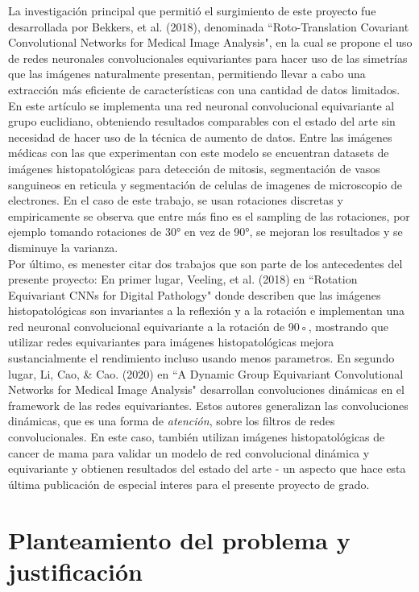 \documentclass[12pt,letterpaper,final, openany]{scrbook}
\begin{document}
La investigación principal que permitió el surgimiento de este proyecto fue desarrollada por Bekkers, et al. (2018), denominada ``Roto-Translation Covariant Convolutional Networks for Medical Image Analysis", en la cual se propone el uso de redes neuronales convolucionales equivariantes para hacer uso de las simetrías que las imágenes naturalmente presentan, permitiendo llevar a cabo una extracción más eficiente de características con una cantidad de datos limitados. En este artículo se implementa una red neuronal convolucional equivariante al grupo euclidiano, obteniendo resultados comparables con el estado del arte sin necesidad de hacer uso de la técnica de aumento de datos. Entre las imágenes médicas con las que experimentan con este modelo se encuentran datasets de imágenes histopatológicas para detección de mitosis, segmentación de vasos sanguineos en reticula y segmentación de celulas de imagenes de microscopio de electrones. En el caso de este trabajo, se usan rotaciones discretas y empiricamente se observa que entre más fino es el sampling de las rotaciones, por ejemplo tomando rotaciones de 30° en vez de 90°, se mejoran los resultados y se disminuye la varianza.
\\
Por último, es menester citar dos trabajos que son parte de los antecedentes del presente proyecto: En primer lugar, Veeling, et al. (2018) en ``Rotation Equivariant CNNs for Digital Pathology" donde describen que las imágenes histopatológicas son invariantes a la reflexión y a la rotación e implementan una red neuronal convolucional equivariante a la rotación de 90◦, mostrando que utilizar redes equivariantes para imágenes histopatológicas mejora sustancialmente el rendimiento incluso usando menos parametros. En segundo lugar, Li, Cao, \& Cao. (2020) en ``A Dynamic Group Equivariant Convolutional Networks for Medical Image Analysis" desarrollan convoluciones dinámicas en el framework de las redes equivariantes. Estos autores generalizan las convoluciones dinámicas, que es una forma de \textit{atención}, sobre los filtros de redes convolucionales. En este caso, también utilizan imágenes histopatológicas de cancer de mama para validar un modelo de red convolucional dinámica y equivariante  y obtienen resultados del estado del arte - un aspecto que hace esta última publicación de especial interes para el presente proyecto de grado.



\newpage
\chapter{Planteamiento del problema y justificación}
\end{document}
